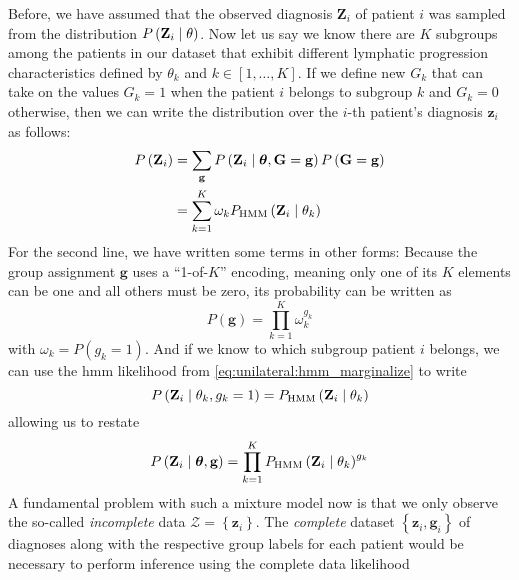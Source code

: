 \documentclass[\relativeRoot/main.tex]{subfiles}
\begin{document}
Before, we have assumed that the observed diagnosis $\mathbf{Z}_i$ of patient $i$ was sampled from the distribution $P \left( \mathbf{Z}_i \mid \theta \right)$. Now let us say we know there are $K$ subgroups among the patients in our dataset that exhibit different lymphatic progression characteristics defined by $\theta_k$ and $k \in [1, \ldots, K]$. If we define new  $G_k$ that can take on the values $G_k = 1$ when the patient $i$ belongs to subgroup $k$ and $G_k = 0$ otherwise, then we can write the distribution over the $i$-th patient's diagnosis $\mathbf{z}_i$ as follows:
%
\begin{equation}
    \begin{aligned}
        P \left( \mathbf{Z}_i \right) &= \sum_{\mathbf{g}}{ P \left( \mathbf{Z}_i \mid \boldsymbol{\theta}, \mathbf{G} = \mathbf{g} \right) P \left(\mathbf{G} = \mathbf{g}\right) } \\
        &= \sum_{k=1}^K{ \omega_k P_\text{HMM} \left( \mathbf{Z}_i \mid \theta_k \right) }
    \end{aligned}
\end{equation}
%
For the second line, we have written some terms in other forms: Because the group assignment $\mathbf{g}$ uses a ``1-of-$K$'' encoding, meaning only one of its $K$ elements can be one and all others must be zero, its probability can be written as
%
\begin{equation}
    P \left(\mathbf{g}\right) = \prod_{k=1}^K{ \omega_k^{g_k} }
\end{equation}
%
with $\omega_k = P \left(g_k = 1\right)$. And if we know to which subgroup patient $i$ belongs, we can use the \gls{hmm} likelihood from \cref{eq:unilateral:hmm_marginalize} to write
%
\begin{equation}
    P \left( \mathbf{Z}_i \mid \theta_k, g_k = 1 \right) = P_\text{HMM} \left( \mathbf{Z}_i \mid \theta_k \right)
\end{equation}
%
allowing us to restate
%
\begin{equation}
    P \left( \mathbf{Z}_i \mid \boldsymbol{\theta}, \mathbf{g} \right) = \prod_{k=1}^K{ P_\text{HMM} \left( \mathbf{Z}_i \mid \theta_k \right)^{g_k} }
\end{equation}
%
A fundamental problem with such a mixture model now is that we only observe the so-called \emph{incomplete} data $\boldsymbol{\mathcal{Z}} = \left\{ \mathbf{z}_i \right\}$. The \emph{complete} dataset $\left\{ \mathbf{z}_i, \mathbf{g}_i \right\}$ of diagnoses along with the respective group labels for each patient would be necessary to perform inference using the complete data likelihood
\end{document}
